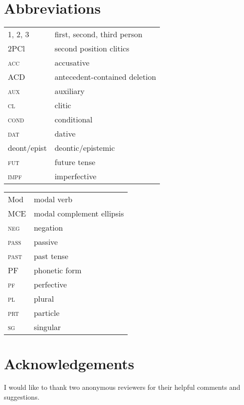 \documentclass[output=paper,colorlinks,citecolor=brown,
modfonts
]{langscibook}
\begin{document}
\section*{Abbreviations}
\begin{tabularx}{.58\textwidth}{@{}lX@{}}
	1, 2, 3 & first, second, third person\\
	2PCl&second position clitics\\
	\textsc{acc} & accusative\\
	ACD&antecedent-contained deletion\\
	\textsc{aux} & auxiliary\\
	\textsc{cl} & clitic\\
    \textsc{cond}&conditional\\	
	\textsc{dat} & dative\\
    deont/epist& deontic/epistemic\\	
    \textsc{fut}&future tense\\
	\textsc{impf}&imperfective\\
\end{tabularx}
\begin{tabularx}{.38\textwidth}{@{}lX@{}}
    Mod & modal verb\\
	MCE&modal complement ellipsis\\
	\textsc{neg} & negation\\
    \textsc{pass}&passive\\
	\textsc{past}&past tense\\
	PF& phonetic form\\
    \textsc{pf}&perfective\\
	\textsc{pl} & plural\\
	\textsc{prt} & particle\\
	\textsc{sg} & singular\\
\end{tabularx}
	
\section*{Acknowledgements}
I would like to thank two anonymous reviewers for their helpful comments and suggestions.

\sloppy
\printbibliography[heading=subbibliography,notkeyword=this]
\end{document}
